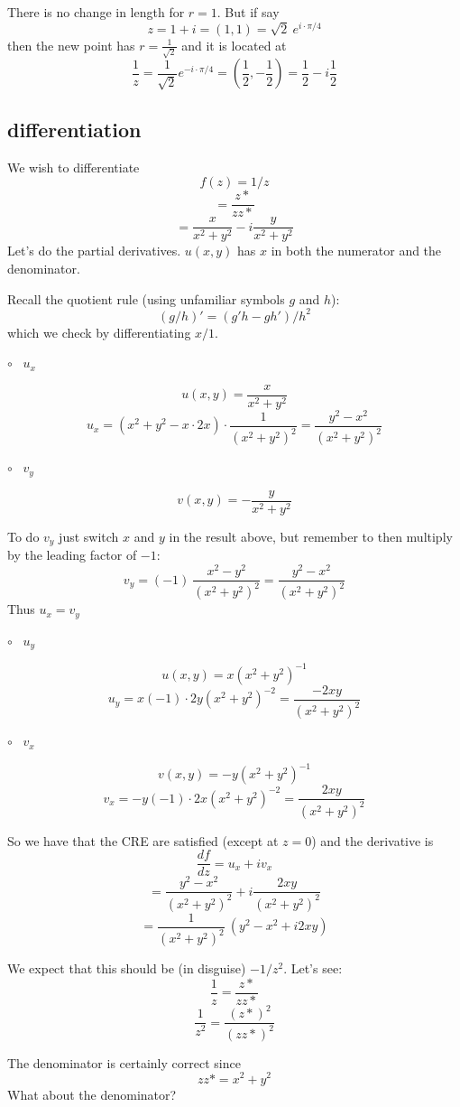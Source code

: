 \documentclass[11pt, oneside]{article}
\begin{document}
There is no change in length for $r=1$.  But if say 
\[ z = 1 + i = (1,1) = \sqrt{2} \ e^{i \cdot \pi/4} \]
then the new point has $r = \frac{1}{\sqrt{2}}$ and it is located at
\[ \frac{1}{z} = \frac{1}{\sqrt{2}} e^{-i \cdot \pi/4} = (\frac{1}{2},- \frac{1}{2}) = \frac{1}{2} - i \frac{1}{2}\]

\subsection*{differentiation}

We wish to differentiate
\[ f(z) = 1/z \]
\[ = \frac{z*}{zz*} \]
\[ = \frac{x}{x^2 + y^2} - i\frac{y}{x^2 + y^2} \]
Let's do the partial derivatives.  $u(x,y)$ has $x$ in both the numerator and the denominator.

Recall the quotient rule (using unfamiliar symbols $g$ and $h$):
\[ (g/h)' = (g'h - gh')/h^2 \]
which we check by differentiating $x/1$.

$\circ$ \ $u_x$

\[ u(x,y) = \frac{x}{x^2 + y^2} \]
\[ u_x = (x^2 + y^2 - x \cdot 2x) \cdot \frac{1}{(x^2 + y^2)^2} = \frac{y^2 - x^2}{(x^2 + y^2)^2} \]

$\circ$ \ $v_y$

\[ v(x,y) =  - \frac{y}{x^2 + y^2} \]

To do $v_y$ just switch $x$ and $y$ in the result above, but remember to then multiply by the leading factor of $-1$:
\[ v_y = (-1) \ \frac{x^2 - y^2}{(x^2 + y^2)^2} = \frac{y^2 - x^2}{(x^2 + y^2)^2} \]
Thus $u_x = v_y$

$\circ$ \ $u_y$

\[ u(x,y) =  x(x^2 + y^2)^{-1} \]
\[ u_y = x(-1) \cdot 2y(x^2 + y^2)^{-2} = \frac{-2xy}{(x^2 + y^2)^2} \]

$\circ$ \ $v_x$

\[ v(x,y) =  - y (x^2 + y^2)^{-1} \]
\[ v_x = - y(-1) \cdot 2x(x^2 + y^2)^{-2} = \frac{2xy}{(x^2 + y^2)^2} \]

So we have that the CRE are satisfied (except at $z=0$) and the derivative is
\[ \frac{df}{dz} = u_x + i v_x \]
\[ =  \frac{y^2 - x^2}{(x^2 + y^2)^2} + i \frac{2xy}{(x^2 + y^2)^2} \]
\[ = \frac{1}{(x^2 + y^2)^2} \ (y^2 - x^2 + i2xy) \]

We expect that this should be (in disguise) $-1/z^2$.  Let's see:
\[ \frac{1}{z} =  \frac{z*}{zz*} \]
\[ \frac{1}{z^2} =  \frac{(z*)^2}{(zz*)^2} \]

The denominator is certainly correct since
\[ zz* = x^2 + y^2 \]
What about the denominator?
\end{document}
